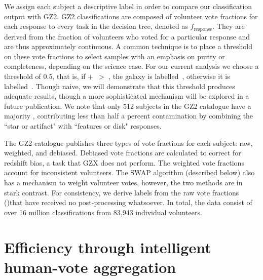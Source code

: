 We assign each subject a descriptive label in order to compare our classification output with GZ2. GZ2 classifications are composed of volunteer vote fractions for each response to every task in the decision tree, denoted as $f_{\mathrm{response}}$. They are derived from the fraction of volunteers who voted for a particular response and are thus approximately continuous. A common technique is to place a threshold on these vote fractions to select samples with an emphasis on purity or completeness, depending on the science case. For our current analysis we choose a threshold of 0.5, that is, if \ffeat+\fstar~$ >$ \fsmooth, the galaxy is labelled~\feat, otherwise it is labelled~\notfeat.  Though naive, we will demonstrate that this threshold produces adequate results, though a more sophisticated mechanism will be explored in a future publication. 
 We note that only 512 subjects in the GZ2 catalogue have a majority \fstar, contributing less than half a percent contamination by combining the ``star or artifact" with ``features or disk" responses.

The GZ2 catalogue publishes three types of vote fractions for each subject: raw, weighted, and debiased. Debiased vote fractions are calculated to correct for redshift bias, a task that GZX does not perform. The weighted vote fractions account for inconsistent volunteers. The SWAP algorithm (described below) also has a mechanism to weight volunteer votes, however, the two methods are in stark contrast. For consistency, we derive labels from the raw vote fractions (\raw)that have received no post-processing whatsoever. In total, the data consist of over 16 million classifications from 83,943 individual volunteers. 


\section{Efficiency through intelligent human-vote aggregation}\label{sec: SWAP}

